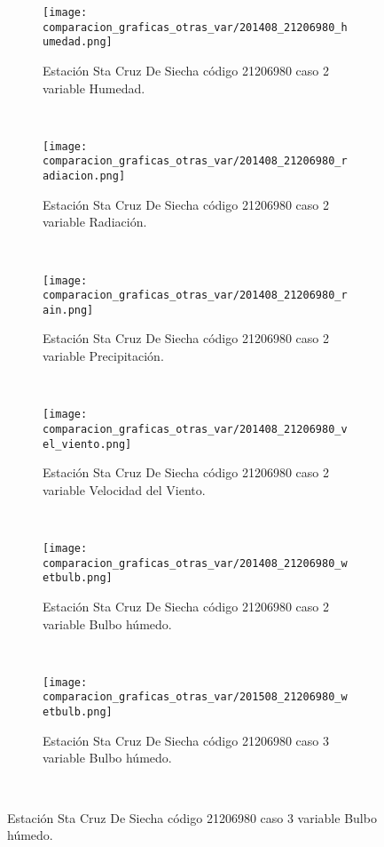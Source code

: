 \begin{figure}[H]
\centering
\begin{subfigure}[normla]{0.4\textwidth}
\caption{Estación Sta Cruz De Siecha código 21206980 caso 2 variable Humedad.}
\texttt{[image: comparacion\_graficas\_otras\_var/201408\_21206980\_humedad.png]}
\end{subfigure}
~
\begin{subfigure}[normla]{0.4\textwidth}
\caption{Estación Sta Cruz De Siecha código 21206980 caso 2 variable Radiación.}
\texttt{[image: comparacion\_graficas\_otras\_var/201408\_21206980\_radiacion.png]}
\end{subfigure}
~
\begin{subfigure}[normla]{0.4\textwidth}
\caption{Estación Sta Cruz De Siecha código 21206980 caso 2 variable Precipitación.}
\texttt{[image: comparacion\_graficas\_otras\_var/201408\_21206980\_rain.png]}
\end{subfigure}
~
\begin{subfigure}[normla]{0.4\textwidth}
\caption{Estación Sta Cruz De Siecha código 21206980 caso 2 variable Velocidad del Viento.}
\texttt{[image: comparacion\_graficas\_otras\_var/201408\_21206980\_vel\_viento.png]}
\end{subfigure}
~
\begin{subfigure}[normla]{0.4\textwidth}
\caption{Estación Sta Cruz De Siecha código 21206980 caso 2 variable Bulbo húmedo.}
\texttt{[image: comparacion\_graficas\_otras\_var/201408\_21206980\_wetbulb.png]}
\end{subfigure}
~
\begin{subfigure}[normla]{0.4\textwidth}
\caption{Estación Sta Cruz De Siecha código 21206980 caso 3 variable Bulbo húmedo.}
\texttt{[image: comparacion\_graficas\_otras\_var/201508\_21206980\_wetbulb.png]}
\end{subfigure}
~
\end{figure}
           

